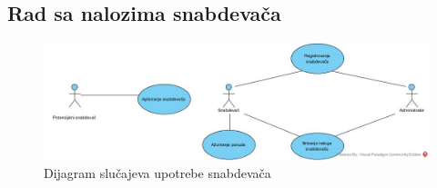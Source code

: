 \subsection{Rad sa nalozima snabdevača}

\begin{figure}[H]
\begin{center}
\includegraphics[width=\textwidth]{Pictures/uc_supplier.jpg}
\end{center}
    \caption{Dijagram slučajeva upotrebe snabdevača}
\label{fig:UCSupplierAccounts}
\end{figure}




